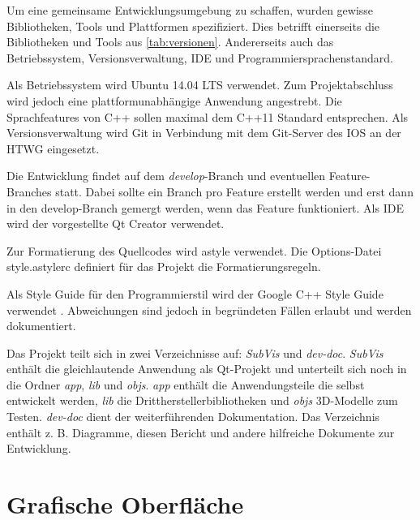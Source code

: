 Um eine gemeinsame Entwicklungsumgebung zu schaffen, wurden gewisse Bibliotheken, Tools und Plattformen spezifiziert.
Dies betrifft einerseits die Bibliotheken und Tools aus \autoref{tab:versionen}.
Andererseits auch das Betriebssystem, Versionsverwaltung, IDE und Programmiersprachenstandard.

Als Betriebssystem wird Ubuntu 14.04 LTS verwendet. 
Zum Projektabschluss wird jedoch eine plattformunabhängige Anwendung angestrebt.
Die Sprachfeatures von C++ sollen maximal dem C++11 Standard entsprechen.
Als Versionsverwaltung wird Git in Verbindung mit dem Git-Server des IOS an der HTWG eingesetzt. 

Die Entwicklung findet auf dem \emph{develop}-Branch und eventuellen Feature-Branches statt.
Dabei sollte ein Branch pro Feature erstellt werden und erst dann in den develop-Branch gemergt werden, wenn das Feature funktioniert.
Als IDE wird der vorgestellte Qt Creator verwendet.

Zur Formatierung des Quellcodes wird astyle verwendet. 
Die Options-Datei style.astylerc definiert für das Projekt die Formatierungsregeln. 

Als Style Guide für den Programmierstil wird der Google C++ Style Guide verwendet \cite{GsgC++}.
Abweichungen sind jedoch in begründeten Fällen erlaubt und werden dokumentiert.

Das Projekt teilt sich in zwei Verzeichnisse auf: \emph{SubVis} und \emph{dev-doc}.
\emph{SubVis} enthält die gleichlautende Anwendung als Qt-Projekt und unterteilt sich noch in die Ordner \emph{app}, \emph{lib} und \emph{objs}.
\emph{app} enthält die Anwendungsteile die selbst entwickelt werden,
\emph{lib} die Drittherstellerbibliotheken und \emph{objs} 3D-Modelle zum Testen.
\emph{dev-doc} dient der weiterführenden Dokumentation.
Das Verzeichnis enthält z. B. Diagramme, diesen Bericht und andere hilfreiche Dokumente zur Entwicklung.

\section{Grafische Oberfläche}

